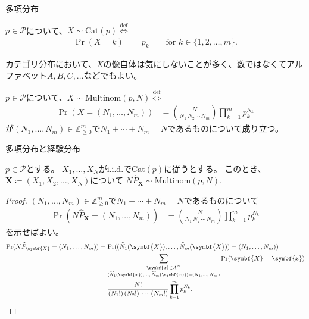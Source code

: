 \documentclass[lualatex,handout]{beamer}
\theoremstyle{definition}
\begin{document}
\begin{frame}{多項分布}
\begin{definition}[カテゴリ分布]
$p\in\mathcal{P}$について、$X\sim\mathrm{Cat}(p)\stackrel{\text{def}}{\iff}$
\begin{align*}
\Pr(X=k) &= p_k\qquad \text{for } k\in\{1,2,\dotsc,m\}.
\end{align*}
\end{definition}
カテゴリ分布において、$X$の像自体は気にしないことが多く、数ではなくてアルファベット$A,B,C,\dotsc$などでもよい。
\begin{definition}[多項分布]
$p\in\mathcal{P}$について、$X\sim\mathrm{Multinom}(p, N)\stackrel{\text{def}}{\iff}$
\begin{align*}
\Pr(X=(N_1,\dotsc,N_m)) &= \binom{N}{N_1\,N_2\,\dotsm\,N_m}\prod_{k=1}^m p_k^{N_k}
\end{align*}
が$(N_1,\dotsc,N_m)\in\mathbb{Z}_{\ge0}^m$で$N_1+\dotsb+N_m=N$であるものについて成り立つ。
\end{definition}
\end{frame}

\begin{frame}{多項分布と経験分布}
\small
\begin{lemma}
$p\in\mathcal{P}$とする。
$X_1,\dotsc,X_N$がi.i.d.で$\mathrm{Cat}(p)$に従うとする。
このとき、$\symbf{X}\coloneq(X_1,X_2,\dotsc,X_N)$について
$N\widehat{P}_{\symbf{X}}\sim\mathrm{Multinom}(p,N)$.
\end{lemma}
\begin{proof}
$(N_1,\dotsc,N_m)\in\mathbb{Z}_{\ge0}^m$で$N_1+\dotsb+N_m=N$であるものについて
\begin{align*}
\Pr(N\widehat{P}_{\symbf{X}}=(N_1,\dotsc,N_m)) &= \binom{N}{N_1\,N_2\,\dotsm\,N_m}\prod_{k=1}^m p_k^{N_k}
\end{align*}
を示せばよい。
\begin{align*}
\Pr(N\widehat{P}_{\symbf{X}}=(N_1,\dotsc,N_m))
 &= \Pr((\widehat{N}_1(\symbf{X}),\dotsc,\widehat{N}_m(\symbf{X}))=(N_1,\dotsc,N_m))\\
 &= \sum_{\substack{\symbf{x}\in A^N\\ (\widehat{N}_1(\symbf{x}),\dotsc,\, \widehat{N}_m(\symbf{x}))=(N_1,\dotsc,\, N_m)}}\Pr(\symbf{X}=\symbf{x})\\
 &=\frac{N!}{(N_1!)\,(N_2!)\,\dotsm\,(N_m!)}\prod_{k=1}^m p_k^{N_k}.\qedhere
\end{align*}
\end{proof}
\end{frame}
\end{document}
